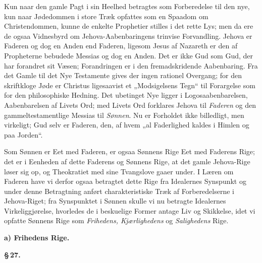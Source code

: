 \documentclass[12pt]{book}
\newcommand{\parmark}[1]{\begin{center}{\bfseries \S\,#1.}\end{center}}
\newcommand{\runhead}[1]{%
  \medskip\begin{center}{\bfseries #1}\end{center}\medskip}
\begin{document}
Kun naar den gamle Pagt i sin Heelhed betragtes som Forberedelse til
den nye, kun naar Jødedommen i store Træk opfattes som en Spaadom om
Christendommen, kunne de enkelte Prophetier stilles i det rette Lys;
men da ere de ogsaa Vidnesbyrd om Jehova-Aabenbaringens trinvise
Forvandling. Jehova er Faderen og dog en Anden end Faderen, ligesom
Jesus af Nazareth er den af Propheterne bebudede Messias og dog en
Anden. Det
er ikke Gud som Gud, der har forandret sit Væsen; Forandringen er i
den fremadskridende Aabenbaring. Fra det Gamle til det Nye Testamente
gives der ingen rationel Overgang; for den skriftkloge Jøde er
Christus ligesaavist et „Modsigelsens Tegn“ til Forargelse som for
den philosophiske Hedning. Det ubetinget Nye ligger i
Logosaabenbarelsen, Aabenbarelsen af Livets Ord; med Livets Ord
forklares Jehova til \emph{Faderen} og den gammeltestamentlige
Messias til \emph{Sønnen}. Nu er Forholdet ikke billedligt, men
virkeligt; Gud selv er Faderen, den, af hvem „al Faderlighed kaldes
i Himlen og paa Jorden“.

Som Sønnen er Eet med Faderen, er ogsaa Sønnens Rige Eet med
Faderens Rige; det er i Eenheden af dette Faderens og Sønnens Rige,
at det gamle Jehova-Rige løser sig op, og Theokratiet med sine
Tvangslove gaaer under. I Læren om Faderen have vi derfor ogsaa
betragtet dette Rige fra Idealernes Synspunkt og under denne
Betragtning anført charakteristiske Træk af Forberedelserne i
Jehova-Riget; fra Synspunktet i Sønnen skulle vi nu betragte
Idealernes Virkeliggjørelse, hvorledes de i beskuelige Former antage
Liv og Skikkelse, idet vi opfatte Sønnens Rige som \emph{Frihedens,
Kjærlighedens} og \emph{Salighedens} Rige.

\runhead{a) Frihedens Rige.}
\parmark{27}
\end{document}
